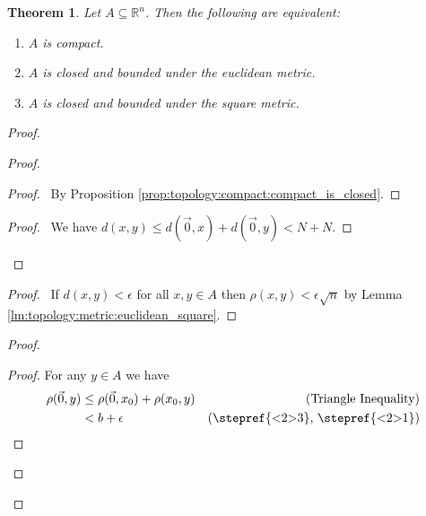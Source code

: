 \documentclass{report}
\newtheorem{thm}[lm]{Theorem}
\theoremstyle{definition}
\begin{document}
  \begin{thm}
    Let $A \subseteq \mathbb{R}^n$. Then the following are equivalent:
    \begin{enumerate}
      \item $A$ is compact.
      \item $A$ is closed and bounded under the euclidean metric.
      \item $A$ is closed and bounded under the square metric.
    \end{enumerate}
  \end{thm}

  \begin{proof}
    \pf
    \begin{proof}
      \begin{proof}
        \pf\ By Proposition \ref{prop:topology:compact:compact_is_closed}.
      \end{proof}
      \begin{proof}
        \pf\ We have $d(x, y) \leq d(\vec{0}, x) + d(\vec{0}, y) < N + N$.
      \end{proof}
    \end{proof}
    \begin{proof}
      \pf\ If $d(x, y) < \epsilon$ for all $x, y \in A$ then $\rho(x, y) <
      \epsilon \sqrt{n}$ by Lemma \ref{lm:topology:metric:euclidean_square}.
    \end{proof}
    \begin{proof}
      \begin{proof}
        \pf For any $y \in A$ we have
        \begin{align*}
          \rho(\vec{0}, y) & \leq \rho(\vec{0}, x_0)
          + \rho(x_0, y) & (\text{Triangle Inequality}) \\
          & < b + \epsilon & (\text{\stepref{<2>3}, \stepref{<2>1}}) \\

\end{align*}
\end{proof}
\end{proof}
\end{proof}
\end{document}
